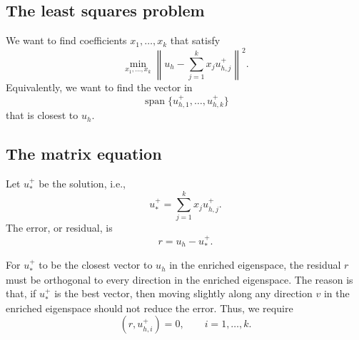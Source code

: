 \documentclass[12pt,a4paper]{article}
\begin{document}
\subsection{The least squares problem}

We want to find coefficients \(x_1,\ldots,x_k\) that satisfy
\begin{equation}
    \min_{x_1,\ldots,x_k}
    \left\| u_h - \sum_{j=1}^k x_j u^+_{h,j} \right\|^2.
\end{equation}
Equivalently, we want to find the vector in
\begin{equation}
    \operatorname{span}\{u^+_{h,1},\ldots,u^+_{h,k}\}
\end{equation}
that is closest to \(u_h\). 

\subsection{The matrix equation}

Let \(u^+_*\) be the solution, i.e.,
\begin{equation}
    u^+_* = \sum_{j=1}^k x_j u^+_{h,j}.
\end{equation}
The error, or residual, is
\begin{equation}
    r = u_h - u^+_*.
\end{equation}

For \(u^+_*\) to be the closest vector to \(u_h\) in the enriched eigenspace, the residual \(r\) must be orthogonal to every direction in the enriched eigenspace. 
The reason is that, if \(u^+_*\) is the best vector, then moving slightly along any direction \(v\) in the enriched eigenspace should not reduce the error. Thus, we require
\begin{equation}
    (r,u^+_{h,i})=0,
    \qquad i=1,\ldots,k.
\end{equation}
\end{document}
